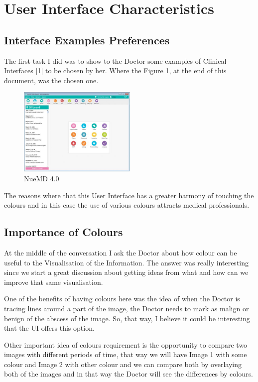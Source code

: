 \section{User Interface Characteristics}
\label{sec:examples}

\subsection{Interface Examples Preferences}

The first task I did was to show to the Doctor some examples of Clinical Interfaces [1] to be chosen by her. Where the Figure 1, at the end of this document, was the chosen one.

\begin{figure}[!hbt]
\centering
\includegraphics[width=0.5\textwidth]{nuemd-2-large.jpg}
\caption{\label{fig:frog}NueMD 4.0}
\end{figure}

The reasons where that this User Interface has a greater harmony of touching the colours and in this case the use of various colours attracts medical professionals.

\subsection{Importance of Colours}

At the middle of the conversation I ask the Doctor about how colour can be useful to the Visualisation of the Information. The answer was really interesting since we start a great discussion about getting ideas from what and how can we improve that same visualisation.

One of the benefits of having colours here was the idea of when the Doctor is tracing lines around a part of the image, the Doctor needs to mark as malign or benign of the abscess of the image. So, that way, I believe it could be interesting that the UI offers this option.

Other important idea of colours requirement is the opportunity to compare two images with different periods of time, that way we will have Image 1 with some colour and Image 2 with other colour and we can compare both by overlaying both of the images and in that way the Doctor will see the differences by colours.

